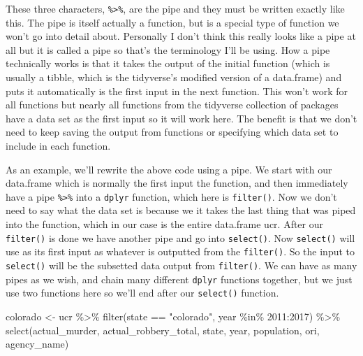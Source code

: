 \documentclass[
]{krantz}
\makeatletter
\newenvironment{Shaded}{\begin{snugshade}}{\end{snugshade}}
\newcommand{\DecValTok}[1]{\textcolor[rgb]{0.06,0.06,0.06}{#1}}
\newcommand{\FunctionTok}[1]{\textcolor[rgb]{0,0,0}{#1}}
\newcommand{\NormalTok}[1]{#1}
\newcommand{\OtherTok}[1]{\textcolor[rgb]{0.37,0.37,0.37}{#1}}
\newcommand{\SpecialCharTok}[1]{\textcolor[rgb]{0,0,0}{#1}}
\newcommand{\StringTok}[1]{\textcolor[rgb]{0.5,0.5,0.5}{#1}}
\newenvironment{kframe}{%
\medskip{}
\setlength{\fboxsep}{.8em}
 \def\at@end@of@kframe{}%
 \ifinner\ifhmode%
  \def\at@end@of@kframe{\end{minipage}}%
  \begin{minipage}{\columnwidth}%
 \fi\fi%
 \def\FrameCommand##1{\hskip\@totalleftmargin \hskip-\fboxsep
 \colorbox{shadecolor}{##1}\hskip-\fboxsep
     \hskip-\linewidth \hskip-\@totalleftmargin \hskip\columnwidth}%
 \MakeFramed {\advance\hsize-\width
   \@totalleftmargin\z@ \linewidth\hsize
   \@setminipage}}%
 {\par\unskip\endMakeFramed%
 \at@end@of@kframe}
\renewenvironment{Shaded}{\begin{kframe}}{\end{kframe}}
\makeatother
\begin{document}
These three characters, \texttt{\%\textgreater{}\%}, are the pipe and they must be written exactly like this. The pipe is itself actually a function, but is a special type of function we won't go into detail about. Personally I don't think this really looks like a pipe at all but it is called a pipe so that's the terminology I'll be using. How a pipe technically works is that it takes the output of the initial function (which is usually a tibble, which is the tidyverse's modified version of a data.frame) and puts it automatically is the first input in the next function. This won't work for all functions but nearly all functions from the tidyverse collection of packages have a data set as the first input so it will work here. The benefit is that we don't need to keep saving the output from functions or specifying which data set to include in each function.

As an example, we'll rewrite the above code using a pipe. We start with our data.frame which is normally the first input the function, and then immediately have a pipe \texttt{\%\textgreater{}\%} into a \texttt{dplyr} function, which here is \texttt{filter()}. Now we don't need to say what the data set is because we it takes the last thing that was piped into the function, which in our case is the entire data.frame ucr. After our \texttt{filter()} is done we have another pipe and go into \texttt{select()}. Now \texttt{select()} will use as its first input as whatever is outputted from the \texttt{filter()}. So the input to \texttt{select()} will be the subsetted data output from \texttt{filter()}. We can have as many pipes as we wish, and chain many different \texttt{dplyr} functions together, but we just use two functions here so we'll end after our \texttt{select()} function.

\begin{Shaded}
\begin{Highlighting}[]
\NormalTok{colorado }\OtherTok{\textless{}{-}}\NormalTok{ ucr }\SpecialCharTok{\%\textgreater{}\%} \FunctionTok{filter}\NormalTok{(state }\SpecialCharTok{==} \StringTok{"colorado"}\NormalTok{,}
\NormalTok{                           year }\SpecialCharTok{\%in\%} \DecValTok{2011}\SpecialCharTok{:}\DecValTok{2017}\NormalTok{) }\SpecialCharTok{\%\textgreater{}\%} \FunctionTok{select}\NormalTok{(actual\_murder,}
\NormalTok{                                                           actual\_robbery\_total,}
\NormalTok{                                                           state, year, population, }
\NormalTok{                                                           ori, agency\_name)}
\end{Highlighting}
\end{Shaded}
\end{document}
